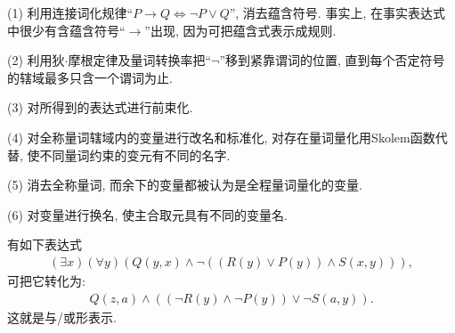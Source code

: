 (1) 利用连接词化规律“$P\rightarrow Q\Leftrightarrow \neg P\vee Q$”, 消去蕴含符号. 事实上, 在事实表达式中很少有含蕴含符号“$\rightarrow$”出现, 因为可把蕴含式表示成规则.

(2) 利用狄$\cdot$摩根定律及量词转换率把“$\neg$”移到紧靠谓词的位置, 直到每个否定符号的辖域最多只含一个谓词为止.

(3) 对所得到的表达式进行前束化.

(4) 对全称量词辖域内的变量进行改名和标准化, 对存在量词量化用Skolem函数代替, 使不同量词约束的变元有不同的名字.

(5) 消去全称量词, 而余下的变量都被认为是全程量词量化的变量.

(6) 对变量进行换名, 使主合取元具有不同的变量名.
\begin{example}
有如下表达式
\begin{align}
    (\exists  x) (\forall y)(Q(y, x)\wedge \neg ((R(y)\vee P(y))\wedge S(x, y))),
\end{align}
可把它转化为:
\begin{align}
    Q(z, a)\wedge ((\neg R(y)\wedge \neg P(y))\vee \neg S(a, y)).
\end{align}
这就是与/或形表示.
\end{example}
